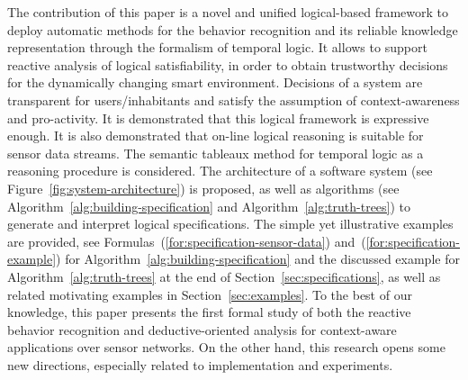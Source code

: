 \documentclass[runningheads,a4paper]{llncs}
\begin{document}
The contribution of this paper is a novel and unified logical-based framework to deploy
automatic methods for the behavior recognition and its reliable knowledge representation
through the formalism of temporal logic.
It allows
to support reactive analysis of logical satisfiability,
in order to obtain trustworthy decisions for the dynamically changing smart environment.
Decisions of a system are transparent for users/inhabitants and
satisfy the assumption of context-awareness and pro-activity.
It is demonstrated that this logical framework is expressive enough.
It is also demonstrated that on-line logical reasoning is suitable for sensor data streams.
The semantic tableaux method for temporal logic as a reasoning procedure is considered.
The architecture of a software system (see Figure~\ref{fig:system-architecture}) is proposed,
as well as algorithms (see Algorithm~\ref{alg:building-specification} and Algorithm~\ref{alg:truth-trees}) to generate and interpret logical specifications.
The simple yet illustrative examples are provided,
see Formulas~(\ref{for:specification-sensor-data}) and~(\ref{for:specification-example}) for Algorithm~\ref{alg:building-specification} and
the discussed example for Algorithm~\ref{alg:truth-trees} at the end of Section~\ref{sec:specifications},
as well as related motivating examples in Section~\ref{sec:examples}.
To the best of our knowledge,
this paper presents the first formal study of
both the reactive behavior recognition and deductive-oriented analysis
for context-aware applications over sensor networks.
On the other hand,
this research opens some new directions, especially related to implementation and experiments.
\end{document}
